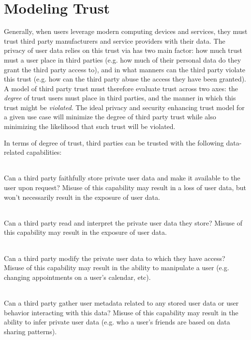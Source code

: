 \section{Modeling Trust}
\label{sec:model}

Generally, when users leverage modern computing devices and services,
they must trust third party manufacturers and service providers with
their data. The privacy of user data relies on this trust via has two
main factor: how much trust must a user place in third parties
(e.g. how much of their personal data do they grant the third party
access to), and in what manners can the third party violate this trust
(e.g. how can the third party abuse the access they have been
granted). A model of third party trust must therefore evaluate trust
across two axes: the \emph{degree} of trust users must place in third
parties, and the manner in which this trust might be
\emph{violated}. The ideal privacy and security enhancing trust model
for a given use case will minimize the degree of third party trust
while also minimizing the likelihood that such trust will be violated.

In terms of degree of trust, third parties can be trusted with the
following data-related capabilities:

\begin{packed_desc}
\item[Storage (S):] \hfill \\ Can a third party faithfully store
  private user data and make it available to the user upon request?
  Misuse of this capability may result in a loss of user data, but
  won't necessarily result in the exposure of user data.
\item[Access (R):] \hfill \\ Can a third party read and interpret the
  private user data they store? Misuse of this capability may result
  in the exposure of user data.
\item[Manipulation (W):] \hfill \\ Can a third party modify the
  private user data to which they have access? Misuse of this
  capability may result in the ability to manipulate a user
  (e.g. changing appointments on a user's calendar, etc).
\item[Meta-analysis (M):] \hfill \\ Can a third party gather user
  metadata related to any stored user data or user behavior
  interacting with this data? Misuse of this capability may result in
  the ability to infer private user data (e.g. who a user's friends
  are based on data sharing patterns).
\end{packed_desc}

